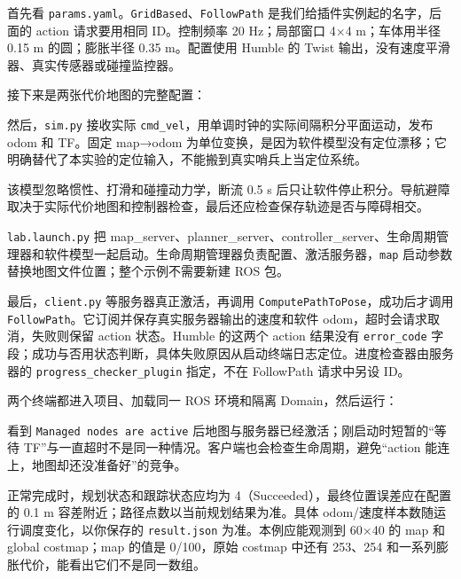 \begin{example}\label{ex:nav-real-run}
首先看 \texttt{params.yaml}。\texttt{GridBased}、\texttt{FollowPath} 是我们给插件实例起的名字，后面的 action 请求要用相同 ID。控制频率 20 Hz；局部窗口 4×4 m；车体用半径 0.15 m 的圆；膨胀半径 0.35 m。配置使用 Humble 的 Twist 输出，没有速度平滑器、真实传感器或碰撞监控器。

接下来是两张代价地图的完整配置：


然后，\texttt{sim.py} 接收实际 \texttt{cmd\_vel}，用单调时钟的实际间隔积分平面运动，发布 odom 和 TF。固定 map→odom 为单位变换，是因为软件模型没有定位漂移；它明确替代了本实验的定位输入，不能搬到真实哨兵上当定位系统。

该模型忽略惯性、打滑和碰撞动力学，断流 0.5 s 后只让软件停止积分。导航避障取决于实际代价地图和控制器检查，最后还应检查保存轨迹是否与障碍相交。

\texttt{lab.launch.py} 把 map\_server、planner\_server、controller\_server、生命周期管理器和软件模型一起启动。生命周期管理器负责配置、激活服务器，\texttt{map} 启动参数替换地图文件位置；整个示例不需要新建 ROS 包。


最后，\texttt{client.py} 等服务器真正激活，再调用 \texttt{ComputePathToPose}，成功后才调用 \texttt{FollowPath}。它订阅并保存真实服务器输出的速度和软件 odom，超时会请求取消，失败则保留 action 状态。Humble 的这两个 action 结果没有 \texttt{error\_code} 字段；成功与否用状态判断，具体失败原因从启动终端日志定位。进度检查器由服务器的 \texttt{progress\_checker\_plugin} 指定，不在 FollowPath 请求中另设 ID。


两个终端都进入项目、加载同一 ROS 环境和隔离 Domain，然后运行：
看到 \texttt{Managed nodes are active} 后地图与服务器已经激活；刚启动时短暂的“等待 TF”与一直超时不是同一种情况。客户端也会检查生命周期，避免“action 能连上，地图却还没准备好”的竞争。

正常完成时，规划状态和跟踪状态应均为 4（Succeeded），最终位置误差应在配置的 0.1 m 容差附近；路径点数以当前规划结果为准。具体 odom/速度样本数随运行调度变化，以你保存的 \texttt{result.json} 为准。本例应能观测到 60×40 的 map 和 global costmap；map 的值是 0/100，原始 costmap 中还有 253、254 和一系列膨胀代价，能看出它们不是同一数组。
\end{example}
